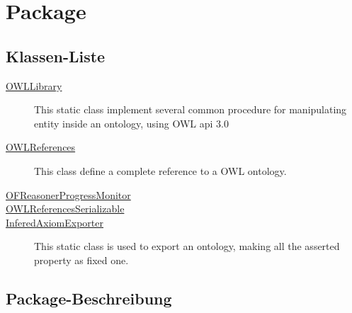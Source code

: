 
\chapter[Package ontologyFramework.OFContextManagement]{Package }\label{ontologyFramework.OFContextManagement-package}



\section{Klassen-Liste}
\begin{description}
\item[{\hyperlink{ontologyFramework.OFContextManagement.OWLLibrary-class}{OWLLibrary}}]
This static class implement several common procedure
 for manipulating entity inside an ontology, using
 OWL api 3.0
\hfill\pageref{ontologyFramework.OFContextManagement.OWLLibrary-class}

\item[{\hyperlink{ontologyFramework.OFContextManagement.OWLReferences-class}{OWLReferences}}]
This class define a complete reference to a OWL ontology.
\hfill\pageref{ontologyFramework.OFContextManagement.OWLReferences-class}

\item[{\hyperlink{ontologyFramework.OFContextManagement.OFReasonerProgressMonitor-class}{OFReasonerProgressMonitor}}]

\hfill\pageref{ontologyFramework.OFContextManagement.OFReasonerProgressMonitor-class}

\item[{\hyperlink{ontologyFramework.OFContextManagement.OWLReferencesSerializable-class}{OWLReferencesSerializable}}]

\hfill\pageref{ontologyFramework.OFContextManagement.OWLReferencesSerializable-class}

\item[{\hyperlink{ontologyFramework.OFContextManagement.InferedAxiomExporter-class}{InferedAxiomExporter}}]
This static class is used to export an ontology, 
 making all the asserted property as fixed one.
\hfill\pageref{ontologyFramework.OFContextManagement.InferedAxiomExporter-class}

\end{description}
\section{Package-Beschreibung}







